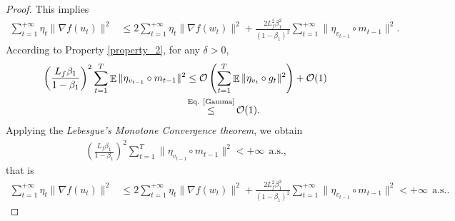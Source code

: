 \documentclass{article} %
\newtheorem{lemma}{Lemma}[section]
\DeclareMathOperator{\Expect}{\mathbb{E}}
\begin{document}
\begin{proof}
This implies 
\begin{align*}
    \sum_{t=1}^{+\infty}\eta_{t}\|\nabla f(u_{t})\|^{2}&\le 2\sum_{t=1}^{+\infty}\eta_{t}\|\nabla f(w_{t})\|^{2}+\frac{2L_{f}^{2}\beta_{1}^{2}}{(1-\beta_{1})^{2}} \sum_{t=1}^{+\infty}\|\eta_{v_{t-1}} \circ m_{t-1}\|^{2}.%
\end{align*}
According to Property \ref{property_2}, for any \(\delta > 0\), 
\begin{align*}
   \left(\frac{L_{f} \beta_{1}}{1 - \beta_{1}} \right)^{2}\sum_{t=1}^{T}\Expect\|\eta_{v_{t-1}}\circ m_{t-1}\|^{2}&\le \mathcal{O}\left(\sum_{t=1}^{T}\Expect\|\eta_{v_{t}}\circ g_{t}\|^{2}\right)+\mathcal{O}(1)\\&\mathop{\le}^{\text{Eq. \ref{Gamma}}}\mathcal{O}(1).
\end{align*}
Applying the \emph{Lebesgue's Monotone Convergence theorem}, we obtain
\begin{align}\label{m_t}
 \left(\frac{L_{f} \beta_{1}}{1 - \beta_{1}} \right)^{2}\sum_{t=1}^{T}\|\eta_{v_{t-1}}\circ m_{t-1}\|^{2} <+\infty\ \ \text{a.s.,}  
\end{align}
that is
\begin{align*}
    \sum_{t=1}^{+\infty}\eta_{t}\|\nabla f(u_{t})\|^{2}&\le 2\sum_{t=1}^{+\infty}\eta_{t}\|\nabla f(w_{t})\|^{2}+\frac{2L_{f}^{2}\beta_{1}^{2}}{(1-\beta_{1})^{2}} \sum_{t=1}^{+\infty}\|\eta_{v_{t-1}} \circ m_{t-1}\|^{2}<+\infty\ \ \text{a.s..} \tag*{\qedhere}
\end{align*}
\end{proof}
\end{document}
